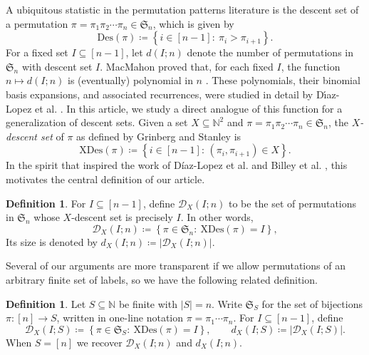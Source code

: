 \documentclass[12pt]{amsart}
\theoremstyle{definition}
\newtheorem{definition}[theorem]{Definition}
\theoremstyle{remark}
\newcommand{\N}{\mathbb{N}}
\newcommand{\Sset}{\mathfrak{S}}
\newcommand{\XD}{\mathrm{XDes}}
\newcommand{\Des}{\mathrm{Des}}
\newcommand{\set}[1]{\left\{#1\right\}}
\newcommand{\abs}[1]{\left|#1\right|}
\newcommand{\brac}[1]{\left[#1\right]}
\begin{document}
\noindent A ubiquitous statistic in the permutation patterns literature is the descent set of a permutation $\pi=\pi_1\pi_2\cdots\pi_n\in\Sset_n$, which is given by
\[
  \Des(\pi)\coloneqq \set{i\in\brac{n-1}:\ \pi_i>\pi_{i+1}}.
\]
For a fixed set $I\subseteq[n-1]$, let $d(I;n)$ denote the number of permutations in $\Sset_n$ with descent set $I$.
MacMahon proved that, for each fixed $I$, the function $n\mapsto d(I;n)$ is (eventually) polynomial in $n$
\cite{macmahon1915combinatory}.
These polynomials, their binomial basis expansions, and associated recurrences, were studied in detail by
D\'{\i}az-Lopez et al. \cite{descentpolys}. In this article, we study a direct analogue of this function for a generalization of descent sets. Given a set $X\subseteq\N^2$ and  $\pi=\pi_1\pi_2\cdots\pi_n\in\Sset_n$, the \emph{$X$-descent set} of $\pi$ as defined by Grinberg and Stanley \cite{grinberg-stanley-redei-berge} is
\[
  \XD(\pi)\coloneqq \set{i\in\brac{n-1}:\,(\pi_i,\pi_{i+1})\in X}.
\]
In the spirit that inspired the work of D\'iaz-Lopez et al. \cite{descentpolys} and Billey et al. \cite{billey-burdzy-sagan-peaks}, this motivates the central definition of our article.

\begin{definition}
For $I \subseteq [n-1]$, define $\mathcal{D}_X(I;n)$ to be the set of permutations in $\mathfrak{S}_n$ whose $X$-descent set is precisely $I$. In other words,
\[
  \mathcal{D}_X(I;n)\coloneqq \set{\pi\in\Sset_n:\ \XD(\pi)=I}, 
\]
Its size is denoted by $d_X(I;n)\coloneqq \abs{\mathcal{D}_X(I;n)}.$
\end{definition}

\medskip 
\noindent Several of our arguments are more transparent if we allow permutations of an arbitrary finite set of labels, so we have the following related definition.

\begin{definition} Let $S\subseteq\N$ be finite with $\abs{S}=n$. Write $\Sset_S$ for the set of bijections $\pi:[n]\to S$, written in
one-line notation $\pi=\pi_1\cdots\pi_n$. For $I\subseteq[n-1]$, define
\[
  \mathcal{D}_X(I;S)\coloneqq\set{\pi\in\Sset_S:\ \XD(\pi)=I},\qquad d_X(I;S)\coloneqq \abs{\mathcal{D}_X(I;S)}.
\]
When $S=[n]$ we recover $\mathcal{D}_X(I;n)$ and $d_X(I;n)$.
\end{definition}
\end{document}
